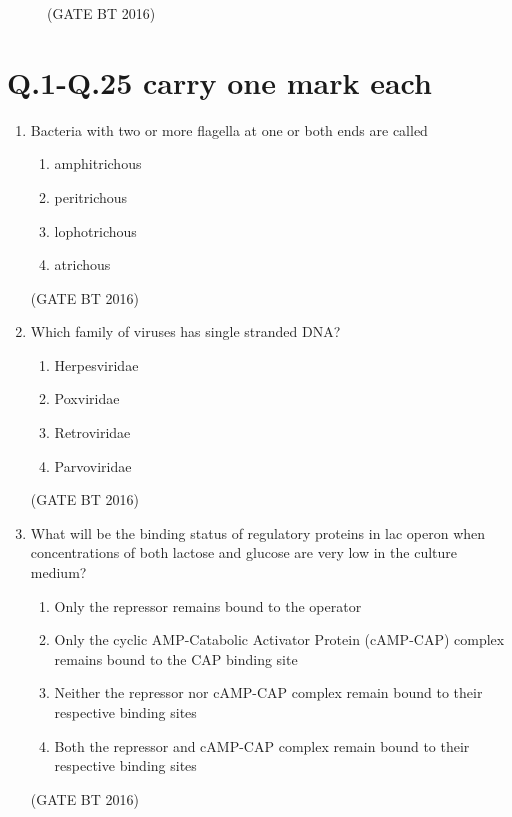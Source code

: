 \documentclass[journal,12pt,onecolumn]{IEEEtran}
\theoremstyle{remark}
\begin{document}
\begin{enumerate}
\begin{figure}[H]
\begin{multicols}{2}
 \end{multicols} \hfill(GATE BT 2016)     
\end{figure}


\end{enumerate}

\section{Q.1-Q.25 carry one mark each}
\begin{enumerate}
  \item Bacteria with two or more flagella at one or both ends are called
\begin{multicols}{4}
\begin{enumerate}
\item amphitrichous	
\item  peritrichous	
\item  lophotrichous	
\item  atrichous
\end{enumerate}
\end{multicols} \hfill(GATE BT 2016)   

 
\item Which family of viruses has single stranded DNA?
\begin{multicols}{4}
\begin{enumerate}
\item  Herpesviridae	
\item Poxviridae	
\item Retroviridae	
\item Parvoviridae
\end{enumerate}
\end{multicols} \hfill(GATE BT 2016)  

\item What will be the binding status of regulatory proteins in lac operon when concentrations of both lactose and glucose are very low in the culture medium?
\begin{multicols}{2}
 \begin{enumerate}
 \item Only the repressor remains bound to the operator
 \item Only the cyclic AMP-Catabolic Activator Protein (cAMP-CAP) complex remains bound to the CAP binding site
\item Neither the repressor nor cAMP-CAP complex remain bound to their respective binding sites
\item Both the repressor and cAMP-CAP complex remain bound to their respective binding sites
 \end{enumerate}
\end{multicols} \hfill(GATE BT 2016)  


\end{enumerate}
\end{document}
